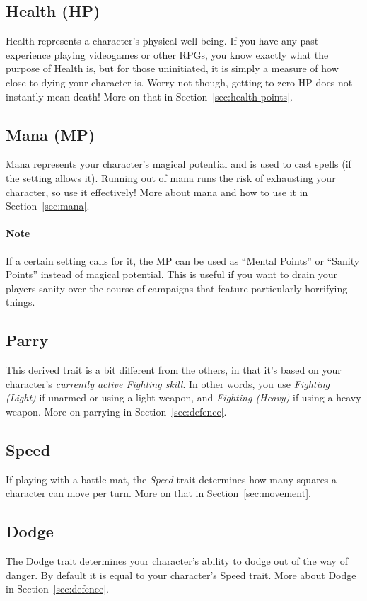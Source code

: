 \subsection{Health (HP)}
Health represents a character's physical well-being.
If you have any past experience playing videogames or other RPGs, you know exactly what the purpose of Health is, but for those uninitiated, it is simply a measure of how close to dying your character is.
Worry not though, getting to zero HP does not instantly mean death!
More on that in Section~\ref{sec:health-points}.

\subsection{Mana (MP)}
Mana represents your character's magical potential and is used to cast spells (if the setting allows it).
Running out of mana runs the risk of exhausting your character, so use it effectively!
More about mana and how to use it in Section~\ref{sec:mana}.

\paragraph{Note} If a certain setting calls for it, the MP can be used as ``Mental Points'' or ``Sanity Points'' instead of magical potential.
This is useful if you want to drain your players sanity over the course of campaigns that feature particularly horrifying things.

\subsection{Parry}
This derived trait is a bit different from the others, in that it's based on your character's \textit{currently active Fighting skill}.
In other words, you use \textit{Fighting (Light)} if unarmed or using a light weapon, and \textit{Fighting (Heavy)} if using a heavy weapon.
More on parrying in Section~\ref{sec:defence}.

\subsection{Speed}
If playing with a battle-mat, the \textit{Speed} trait determines how many squares a character can move per turn.
More on that in Section~\ref{sec:movement}.

\subsection{Dodge}
The Dodge trait determines your character's ability to dodge out of the way of danger. 
By default it is equal to your character's Speed trait.
More about Dodge in Section~\ref{sec:defence}.


